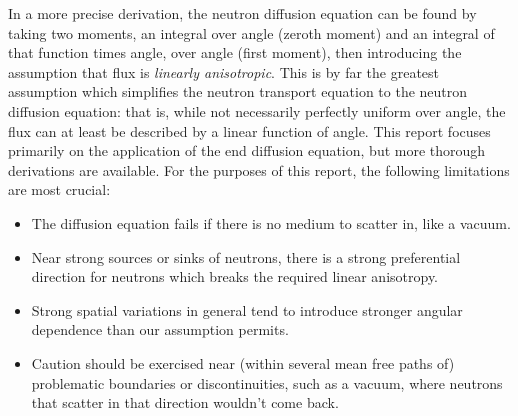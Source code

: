 \documentclass[12pt]{article}
\begin{document}
In a more precise derivation, the neutron diffusion equation can be found by taking two moments, an integral over angle (zeroth moment) and an integral of that function times angle, over angle (first moment), then introducing the assumption that flux is \emph{linearly anisotropic}. This is by far the greatest assumption which simplifies the neutron transport equation to the neutron diffusion equation: that is, while not necessarily perfectly uniform over angle, the flux can at least be described by a linear function of angle.
This report focuses primarily on the application of the end diffusion equation, but more thorough derivations are available.\cite{novak_lecture6_2026}
For the purposes of this report, the following limitations are most crucial:
\begin{itemize}
    \item The diffusion equation fails if there is no medium to scatter in, like a vacuum.
    \item Near strong sources or sinks of neutrons, there is a strong preferential direction for neutrons which breaks the required linear anisotropy.
    \item Strong spatial variations in general tend to introduce stronger angular dependence than our assumption permits.
    \item Caution should be exercised near (within several mean free paths of) problematic boundaries or discontinuities, such as a vacuum, where neutrons that scatter in that direction wouldn't come back.
\end{itemize}
\end{document}
